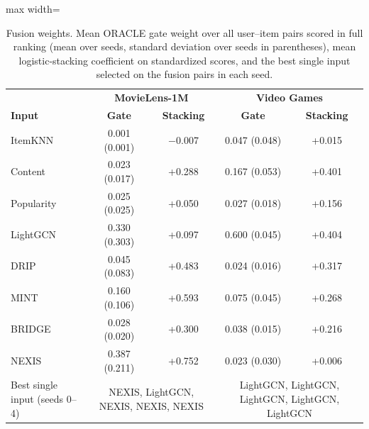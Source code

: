 \documentclass[10pt,a4paper]{article}
\begin{document}
\begin{table}[!ht]
\centering
\caption{Fusion weights. Mean ORACLE gate weight over all user--item pairs scored in full ranking (mean over seeds, standard deviation over seeds in parentheses), mean logistic-stacking coefficient on standardized scores, and the best single input selected on the fusion pairs in each seed.}
\label{tab:s_gates}
\footnotesize
\begin{adjustbox}{max width=\textwidth}
\begin{tabular}{@{}l cc cc@{}}
\toprule
& \multicolumn{2}{c}{\textbf{MovieLens-1M}} & \multicolumn{2}{c}{\textbf{Video Games}} \\
\textbf{Input} & \textbf{Gate} & \textbf{Stacking} & \textbf{Gate} & \textbf{Stacking} \\
\midrule
ItemKNN & 0.001 (0.001) & $-$0.007 & 0.047 (0.048) & +0.015 \\
Content & 0.023 (0.017) & +0.288 & 0.167 (0.053) & +0.401 \\
Popularity & 0.025 (0.025) & +0.050 & 0.027 (0.018) & +0.156 \\
LightGCN & 0.330 (0.303) & +0.097 & 0.600 (0.045) & +0.404 \\
DRIP & 0.045 (0.083) & +0.483 & 0.024 (0.016) & +0.317 \\
MINT & 0.160 (0.106) & +0.593 & 0.075 (0.045) & +0.268 \\
BRIDGE & 0.028 (0.020) & +0.300 & 0.038 (0.015) & +0.216 \\
NEXIS & 0.387 (0.211) & +0.752 & 0.023 (0.030) & +0.006 \\
\midrule
Best single input (seeds 0--4) & \multicolumn{2}{c}{NEXIS, LightGCN, NEXIS, NEXIS, NEXIS} & \multicolumn{2}{c}{LightGCN, LightGCN, LightGCN, LightGCN, LightGCN} \\
\bottomrule
\end{tabular}
\end{adjustbox}
\end{table}
\end{document}
